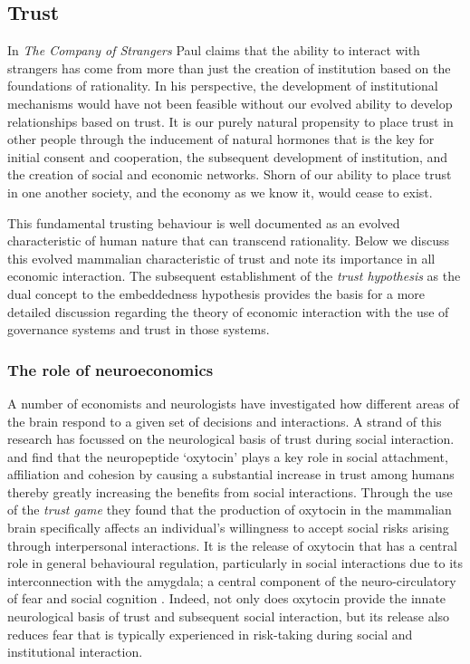 \begin{subappendices}
\section{Trust}
\label{App:trust}

In \emph{The Company of Strangers} Paul \citet{Seabright2009} claims that the ability to interact with strangers has come from more than just the creation of institution based on the foundations of rationality. In his perspective, the development of institutional mechanisms would have not been feasible without our evolved ability to develop relationships based on trust. It is our purely natural propensity to place trust in other people through the inducement of natural hormones that is the key for initial consent and cooperation, the subsequent development of institution, and the creation of social and economic networks. Shorn of our ability to place trust in one another society, and the economy as we know it, would cease to exist.

This fundamental trusting behaviour is well documented as an evolved characteristic of human nature that can transcend rationality. Below we discuss this evolved mammalian characteristic of trust and note its importance in all economic interaction. The subsequent establishment of the \emph{trust hypothesis} as the dual concept to the embeddedness hypothesis provides the basis for a more detailed discussion regarding the theory of economic interaction with the use of governance systems and trust in those systems.

\subsubsection{The role of neuroeconomics}

A number of economists and neurologists have investigated how different areas of the brain respond to a given set of decisions and interactions. A strand of this research has focussed on the neurological basis of trust during social interaction. \citet{Zak2004} and \citet{Kosfeld2005} find that the neuropeptide `oxytocin' plays a key role in social attachment, affiliation and cohesion by causing a substantial increase in trust among humans thereby greatly increasing the benefits from social interactions. Through the use of the \emph{trust game} they found that the production of oxytocin in the mammalian brain specifically affects an individual's willingness to accept social risks arising through interpersonal interactions. It is the release of oxytocin that has a central role in general behavioural regulation, particularly in social interactions due to its interconnection with the amygdala; a central component of the neuro-circulatory of fear and social cognition \citep{Kirsch2005}. Indeed, not only does oxytocin provide the innate neurological basis of trust and subsequent social interaction, but its release also reduces fear that is typically experienced in risk-taking during social and institutional interaction.


\end{subappendices}
